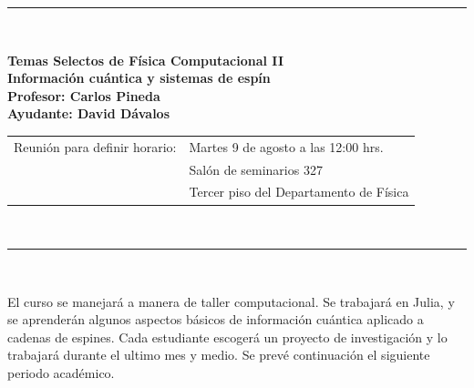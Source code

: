 \documentclass[pdftex,12pt, letterpaper]{report}
\newcommand{\HRule}{\rule{\linewidth}{0.5mm}}
\begin{document}
\begin{titlepage}

\begin{center}




\pagecolor{backgroundcolor}
\HRule \\[0.0cm]
{ \Large \bfseries 
Temas Selectos de Física Computacional II
\\[.5cm]
\Huge
Información cuántica y sistemas de espín
\\ \Large Profesor: Carlos Pineda
\\ \Large Ayudante: David Dávalos
\\[.5cm]
\Large
\begin{tabular}{rl}
Reunión para definir horario: & Martes 9 de agosto a las 12:00 hrs.\\
& Salón de seminarios 327\\
& Tercer piso del Departamento de Física
\end{tabular}
}\\[0.4cm]
\HRule \\[1.0cm]

\large 

\parbox{.8\textwidth}{
El curso se manejará a manera de taller computacional.  Se trabajará en Julia, 
y se aprenderán algunos aspectos básicos de información cuántica aplicado
a cadenas de espines. 
Cada estudiante
escogerá un proyecto de investigación y lo trabajará durante el ultimo mes y medio.
Se prevé continuación el siguiente periodo académico.
}\\[1cm]




\end{center}
\end{titlepage}
\end{document}
